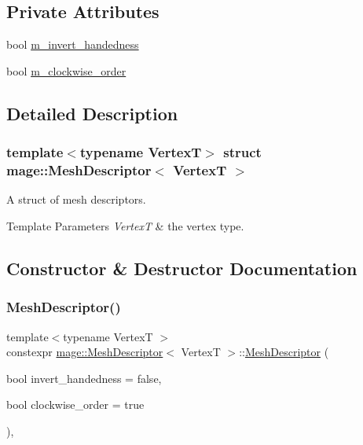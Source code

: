 \subsection*{Private Attributes}
\begin{DoxyCompactItemize}
\item 
bool \hyperlink{structmage_1_1_mesh_descriptor_af7b8124e44ac65ca2088d5d8ca0639f5}{m\+\_\+invert\+\_\+handedness}
\item 
bool \hyperlink{structmage_1_1_mesh_descriptor_a7e769c8d1d81b3514b951b306865dc88}{m\+\_\+clockwise\+\_\+order}
\end{DoxyCompactItemize}


\subsection{Detailed Description}
\subsubsection*{template$<$typename VertexT$>$\newline
struct mage\+::\+Mesh\+Descriptor$<$ Vertex\+T $>$}

A struct of mesh descriptors.


\begin{DoxyTemplParams}{Template Parameters}
{\em VertexT} & the vertex type. \\
\hline
\end{DoxyTemplParams}


\subsection{Constructor \& Destructor Documentation}
\hypertarget{structmage_1_1_mesh_descriptor_a4289c5df5350c5fd8277c16bd9af1f8b}{}\label{structmage_1_1_mesh_descriptor_a4289c5df5350c5fd8277c16bd9af1f8b} 
\subsubsection{\texorpdfstring{Mesh\+Descriptor()}{MeshDescriptor()}\hspace{0.1cm}{\footnotesize\ttfamily [1/3]}}
{\footnotesize\ttfamily template$<$typename VertexT $>$ \\
constexpr \hyperlink{structmage_1_1_mesh_descriptor}{mage\+::\+Mesh\+Descriptor}$<$ VertexT $>$\+::\hyperlink{structmage_1_1_mesh_descriptor}{Mesh\+Descriptor} (\begin{DoxyParamCaption}\item[{bool}]{invert\+\_\+handedness = {\ttfamily false},  }\item[{bool}]{clockwise\+\_\+order = {\ttfamily true} }\end{DoxyParamCaption})\hspace{0.3cm}{\ttfamily [explicit]}, {\ttfamily [noexcept]}}

